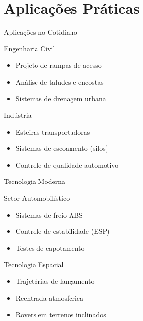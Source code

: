 \documentclass[12pt]{beamer}
\begin{document}
\section{Aplicações Práticas}

\begin{frame}{Aplicações no Cotidiano}
    \begin{block}{Engenharia Civil}
        \begin{itemize}
            \item Projeto de rampas de acesso
            \item Análise de taludes e encostas
            \item Sistemas de drenagem urbana
        \end{itemize}
    \end{block}

    \begin{block}{Indústria}
        \begin{itemize}
            \item Esteiras transportadoras
            \item Sistemas de escoamento (silos)
            \item Controle de qualidade automotivo
        \end{itemize}
    \end{block}
\end{frame}

\begin{frame}{Tecnologia Moderna}
    \begin{block}{Setor Automobilístico}
        \begin{itemize}
            \item Sistemas de freio ABS
            \item Controle de estabilidade (ESP)
            \item Testes de capotamento
        \end{itemize}
    \end{block}

    \begin{block}{Tecnologia Espacial}
        \begin{itemize}
            \item Trajetórias de lançamento
            \item Reentrada atmosférica
            \item Rovers em terrenos inclinados
        \end{itemize}
    \end{block}
\end{frame}
\end{document}
